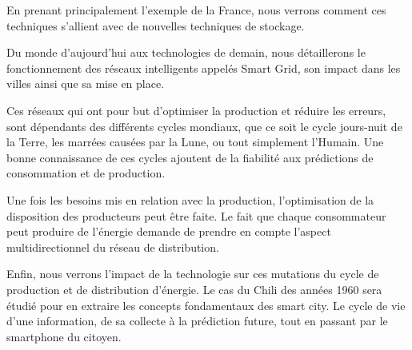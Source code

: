 En prenant principalement l'exemple de la France, nous verrons comment ces techniques s'allient avec
de nouvelles techniques de stockage.

Du monde d'aujourd'hui aux technologies de demain, nous détaillerons le fonctionnement des réseaux intelligents
appelés Smart Grid, son impact dans les villes ainsi que sa mise en place.

Ces réseaux qui ont pour but d'optimiser la production et réduire les erreurs, sont dépendants des différents cycles
mondiaux, que ce soit le cycle jours-nuit de la Terre, les marrées causées par la Lune, ou tout simplement l'Humain.
Une bonne connaissance de ces cycles ajoutent de la fiabilité aux prédictions de consommation et de production.

Une fois les besoins mis en relation avec la production, l'optimisation de la disposition
des producteurs peut être faite.
Le fait que chaque consommateur peut produire de l'énergie demande de prendre en compte l'aspect
multidirectionnel du réseau de distribution.

Enfin, nous verrons l'impact de la technologie sur ces mutations du cycle de production et de distribution d'énergie.
Le cas du Chili des années 1960 sera étudié pour en extraire les concepts fondamentaux des smart city.
Le cycle de vie d'une information, de sa collecte à la prédiction future, tout en passant par le smartphone du citoyen.

